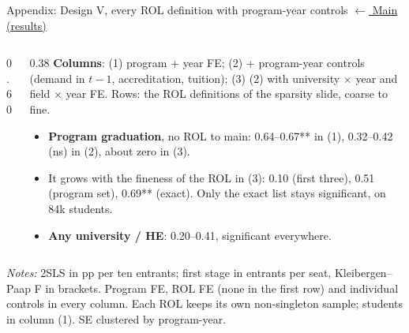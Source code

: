 \documentclass{beamer}
\begin{document}
\begin{frame}[label=d5-app-rol-ctrl]{Appendix: Design V, every ROL definition with program-year controls}
\vspace{-0.3cm}
\hyperlink{d5-results}{\tiny\color{blue}$\leftarrow$ Main (results)}

\begin{columns}[T,onlytextwidth]
\begin{column}{0.60\textwidth}
\centering
\tiny
\resizebox{\linewidth}{!}{}
\end{column}
\begin{column}{0.38\textwidth}
\scriptsize
\textbf{Columns}: (1) program + year FE; (2) + program-year controls (demand in $t-1$, accreditation, tuition); (3) (2) with university $\times$ year and field $\times$ year FE. Rows: the ROL definitions of the sparsity slide, coarse to fine.
\begin{itemize}
    \setlength{\itemsep}{2pt}
    \item \textbf{Program graduation}, no ROL to main: 0.64--0.67** in (1), 0.32--0.42 (ns) in (2), about zero in (3).
    \item It grows with the fineness of the ROL in (3): 0.10 (first three), 0.51 (program set), 0.69** (exact). Only the exact list stays significant, on 84k students.
    \item \textbf{Any university / HE}: 0.20--0.41, significant everywhere.
\end{itemize}
\end{column}
\end{columns}

\vspace{0.05cm}
\parbox{0.97\textwidth}{\tiny \textit{Notes:} 2SLS in pp per ten entrants; first stage in entrants per seat, Kleibergen--Paap F in brackets. Program FE, ROL FE (none in the first row) and individual controls in every column. Each ROL keeps its own non-singleton sample; students in column (1). SE clustered by program-year.}
\end{frame}
\end{document}
